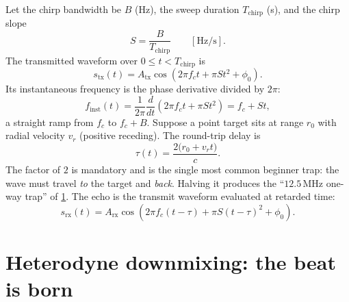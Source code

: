 \documentclass[11pt,oneside]{book}
\begin{document}
Let the chirp bandwidth be $B$ (Hz), the sweep duration $T_{\mathrm{chirp}}$
(s), and the chirp slope
\begin{equation}
S = \frac{B}{T_{\mathrm{chirp}}}\qquad[\mathrm{Hz/s}].
\label{eq:slope}
\end{equation}
The transmitted waveform over $0\le t<T_{\mathrm{chirp}}$ is
\begin{equation}
s_{\mathrm{tx}}(t) = A_{\mathrm{tx}}\cos\!\left(2\pi f_c t + \pi S t^2 + \phi_0\right).
\label{eq:stx}
\end{equation}
Its instantaneous frequency is the phase derivative divided by $2\pi$:
\begin{equation}
f_{\mathrm{inst}}(t)=\frac{1}{2\pi}\frac{d}{dt}\left(2\pi f_c t+\pi S t^2\right)
= f_c + St,
\label{eq:finst}
\end{equation}
a straight ramp from $f_c$ to $f_c+B$. Suppose a point target sits at range
$r_0$ with radial velocity $v_r$ (positive receding). The round-trip delay is
\begin{equation}
\tau(t) = \frac{2\big(r_0+v_r t\big)}{c}.
\label{eq:tau}
\end{equation}
The factor of $2$ is mandatory and is the single most common beginner trap:
the wave must travel \emph{to} the target and \emph{back}. Halving it
produces the ``$12.5\,\mathrm{MHz}$ one-way trap'' of \cref{sec:beat}.
The echo is the transmit waveform evaluated at retarded time:
\begin{equation}
s_{\mathrm{rx}}(t) = A_{\mathrm{rx}}\cos\!\left(2\pi f_c (t-\tau) + \pi S (t-\tau)^2 + \phi_0\right).
\label{eq:srx}
\end{equation}

\section{Heterodyne downmixing: the beat is born}
\label{sec:beat}
\end{document}
